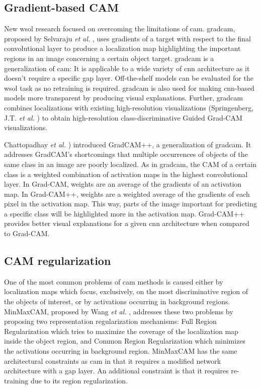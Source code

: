 \subsection{Gradient-based CAM}
New \acrshort{wsol} research focused on overcoming the limitations of \acrshort{cam}. \acrfull{gradcam}, proposed by Selvaraju \textit{et al.} \cite{selvaraju2017grad}, uses gradients of a target with respect to the final convolutional layer to produce a localization map highlighting the important regions in an image concerning a certain object target. \acrshort{gradcam} is a generalization of \acrshort{cam}: It is applicable to a wide variety of \acrshort{cnn} architecture as it doesn't require a specific \acrshort{gap} layer. Off-the-shelf models can be evaluated for the \acrshort{wsol} task as no retraining is required. \acrshort{gradcam} is also used for making \acrshort{cnn}-based models more transparent by producing visual explanations. Further, \acrshort{gradcam} combines localizations with existing high-resolution visualizations (Springenberg, J.T. \textit{et al.} \cite{springenberg2014striving}) to obtain high-resolution class-discriminative Guided Grad-CAM visualizations.

Chattopadhay \textit{et al.} \cite{chattopadhay2018grad}) introduced GradCAM++, a generalization of \acrshort{gradcam}. It addresses GradCAM's shortcomings that multiple occurrences of objects of the same class in an image are poorly localized. As in \acrshort{gradcam}, the CAM of a certain class is a weighted combination of activation maps in the highest convolutional layer. In Grad-CAM, weights are an average of the gradients of an activation map. In Grad-CAM++, weights are a weighted average of the gradients of each pixel in the activation map. This way, parts of the image important for predicting a specific class will be highlighted more in the activation map. Grad-CAM++ provides better visual explanations for a given \acrshort{cnn} architecture when compared to Grad-CAM.

\subsection{CAM regularization}
One of the most common problems of \acrshort{cam} methods is caused either by localization maps which focus, exclusively, on the most discriminative region of the objects of interest, or by activations occurring in background regions. MinMaxCAM, proposed by Wang \textit{et al.} \cite{wang2021minmaxcam}, addresses these two problems by proposing two representation regularization mechanisms: Full Region Regularization which tries to maximize the coverage of the localization map inside the object region, and Common Region Regularization which minimizes the activations occurring in background region. MinMaxCAM has the same architectural constraints as \acrshort{cam} in that it requires a modified network architecture with a \acrshort{gap} layer. An additional constraint is that it requires re-training due to its region regularization.

